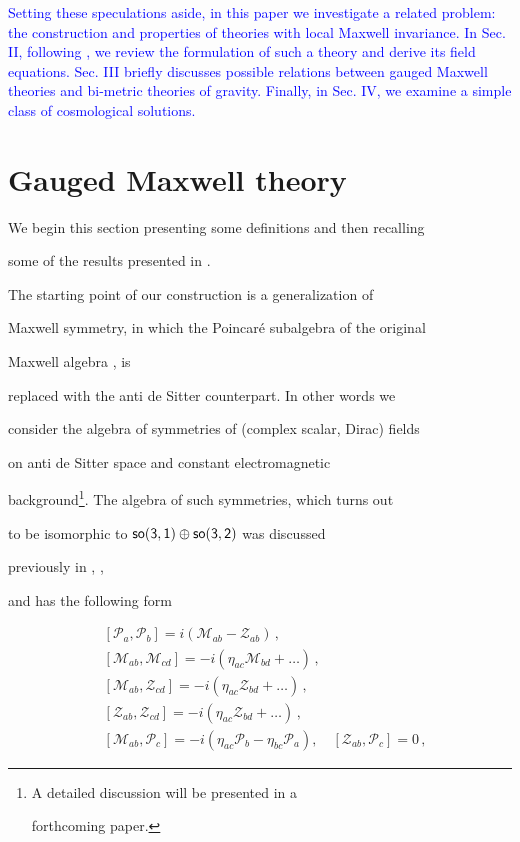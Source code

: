 \documentclass [prd,reprint,eqsecnum,nofootinbib]  {revtex4-1}
\newcommand{\corr}[1]{\textcolor{blue}{#1}}
\begin{document}
\corr{Setting these speculations aside, in this paper we investigate a
related problem: the construction and properties of theories with
local Maxwell invariance. In Sec. II, following
\cite{Durka:2011nf}, we review the formulation of such a theory and
derive its field equations. Sec. III briefly discusses possible
relations between gauged Maxwell theories and bi-metric theories of
gravity. Finally, in Sec. IV, we examine a simple class of
cosmological solutions.}

\section{Gauged Maxwell theory}



We begin this section presenting some definitions and then recalling

some of the results presented in \cite{Durka:2011nf}.



The starting point of our construction is a generalization of

Maxwell symmetry, in which the Poincar\'e subalgebra of the original

Maxwell algebra \cite{Bacry:1970ye}, \cite{Schrader:1972zd} is

replaced with the anti de Sitter counterpart. In other words we

consider the algebra of symmetries of (complex scalar, Dirac) fields

on anti de Sitter space and constant electromagnetic

background\footnote{A detailed discussion will be presented in a

forthcoming paper.}. The algebra of such symmetries, which turns out

to be  isomorphic to $\sf{so}(3,1)\oplus\sf{so}(3,2)$ was discussed

previously in \cite{Soroka:2006aj}, \cite{Bonanos:2010fw},

\cite{Lukierski:2010dy} and has the following form

\cite{Durka:2011nf}

\begin{align}

&[\mathcal{P}_{a},\mathcal{P}_{b}]=i(\mathcal{M}_{ab}-\mathcal{Z}_{ab})\,

,\nonumber\\

&[\mathcal{M}_{ab},\mathcal{M}_{cd}]=-i(\eta_{ac}\mathcal{M}_{bd}+\ldots)\, ,\nonumber\\

&[\mathcal{M}_{ab},\mathcal{Z}_{cd}]=-i(\eta_{ac}\mathcal{Z}_{bd}+\ldots)\,,\nonumber\\

&[\mathcal{Z}_{ab},\mathcal{Z}_{cd}]=-i(\eta_{ac}\mathcal{Z}_{bd}+\ldots)\, ,\nonumber\\

&[\mathcal{M}_{ab},\mathcal{P}_c]=-i(\eta_{ac}\mathcal{P}_{b}-\eta_{bc}\mathcal{P}_{a}),\quad

[\mathcal{Z}_{ab},\mathcal{P}_{c}]=0\,,\label{1}

\end{align}
\end{document}
